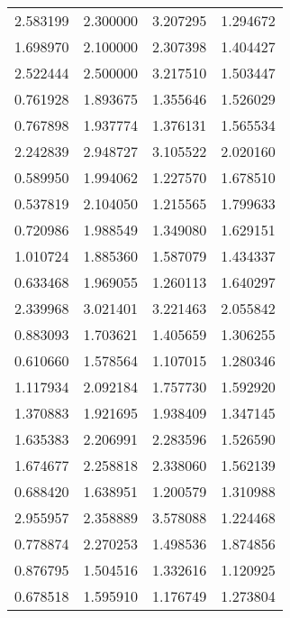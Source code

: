 \begin{longtable}{rrrr}
 2.583199 &        2.300000 &          3.207295 &                1.294672 \\
 1.698970 &        2.100000 &          2.307398 &                1.404427 \\
 2.522444 &        2.500000 &          3.217510 &                1.503447 \\
 0.761928 &        1.893675 &          1.355646 &                1.526029 \\
 0.767898 &        1.937774 &          1.376131 &                1.565534 \\
 2.242839 &        2.948727 &          3.105522 &                2.020160 \\
 0.589950 &        1.994062 &          1.227570 &                1.678510 \\
 0.537819 &        2.104050 &          1.215565 &                1.799633 \\
 0.720986 &        1.988549 &          1.349080 &                1.629151 \\
 1.010724 &        1.885360 &          1.587079 &                1.434337 \\
 0.633468 &        1.969055 &          1.260113 &                1.640297 \\
 2.339968 &        3.021401 &          3.221463 &                2.055842 \\
 0.883093 &        1.703621 &          1.405659 &                1.306255 \\
 0.610660 &        1.578564 &          1.107015 &                1.280346 \\
 1.117934 &        2.092184 &          1.757730 &                1.592920 \\
 1.370883 &        1.921695 &          1.938409 &                1.347145 \\
 1.635383 &        2.206991 &          2.283596 &                1.526590 \\
 1.674677 &        2.258818 &          2.338060 &                1.562139 \\
 0.688420 &        1.638951 &          1.200579 &                1.310988 \\
 2.955957 &        2.358889 &          3.578088 &                1.224468 \\
 0.778874 &        2.270253 &          1.498536 &                1.874856 \\
 0.876795 &        1.504516 &          1.332616 &                1.120925 \\
 0.678518 &        1.595910 &          1.176749 &                1.273804 \\

\end{longtable}
